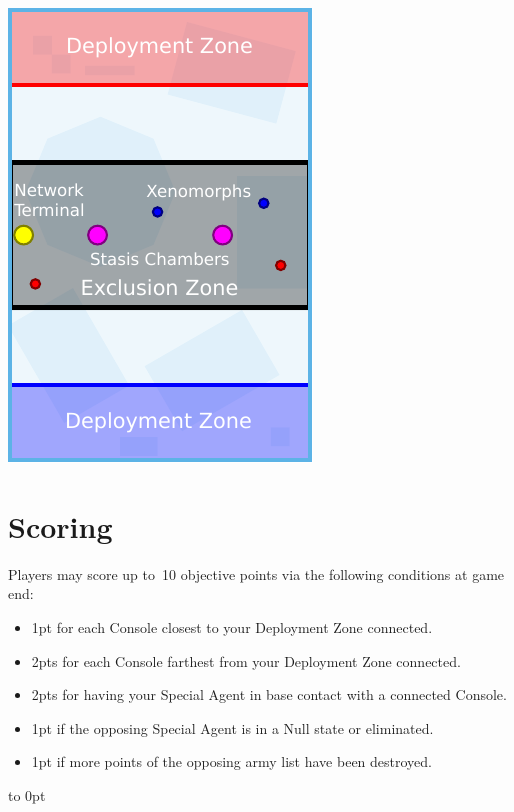 \begin{minipage}[t]{2in}\centering
\vspace{4pt}   
\includegraphics{maps/map-bio}
\end{minipage}

\section{Scoring}

Players may score up to~10 objective points via the following
conditions at game end:
\begin{itemize}\shortlist
\item 1pt for each Console closest to your Deployment Zone connected.
\item 2pts for each Console farthest from your Deployment Zone
  connected.
\item 2pts for having your Special Agent in base contact with a
  connected Console.
\item 1pt if the opposing Special Agent is in a Null state or eliminated.
\item 1pt if more points of the opposing army list have been destroyed.
\end{itemize}

\vfill
\vbox to 0pt{}